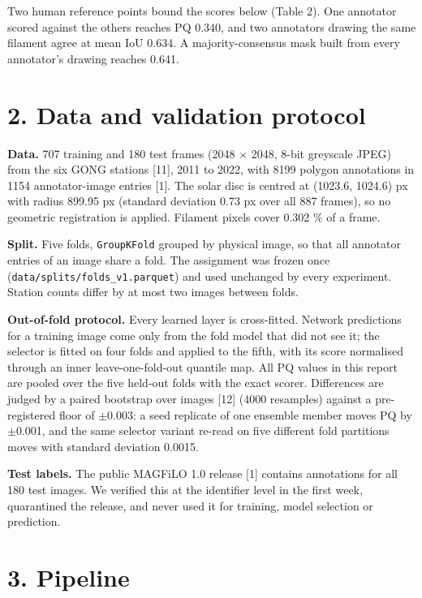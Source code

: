 Two human reference points bound the scores below (Table 2). One annotator scored against the
others reaches PQ 0.340, and two annotators drawing the same filament agree at mean IoU 0.634. A
majority-consensus mask built from every annotator's drawing reaches 0.641.

\section{2. Data and validation protocol}\label{data-and-validation-protocol}

\textbf{Data.} 707 training and 180 test frames (2048 $\times$ 2048, 8-bit greyscale JPEG) from the six GONG
stations {[}11{]}, 2011 to 2022, with 8199 polygon annotations in 1154 annotator-image entries {[}1{]}.
The solar disc is centred at (1023.6, 1024.6) px with radius 899.95 px (standard deviation 0.73 px
over all 887 frames), so no geometric registration is applied. Filament pixels cover 0.302 \% of a
frame.

\textbf{Split.} Five folds, \texttt{GroupKFold} grouped by physical image, so that all annotator entries of an
image share a fold. The assignment was frozen once (\texttt{data/splits/folds\_v1.parquet}) and used
unchanged by every experiment. Station counts differ by at most two images between folds.

\textbf{Out-of-fold protocol.} Every learned layer is cross-fitted. Network predictions for a training
image come only from the fold model that did not see it; the selector is fitted on four folds and
applied to the fifth, with its score normalised through an inner leave-one-fold-out quantile map.
All PQ values in this report are pooled over the five held-out folds with the exact scorer.
Differences are judged by a paired bootstrap over images {[}12{]} (4000 resamples) against a pre-registered
floor of $\pm$0.003: a seed replicate of one ensemble member moves PQ by $\pm$0.001, and the same selector
variant re-read on five different fold partitions moves with standard deviation 0.0015.

\textbf{Test labels.} The public MAGFiLO 1.0 release {[}1{]} contains annotations for all 180 test images.
We verified this at the identifier level in the first week, quarantined the release, and never
used it for training, model selection or prediction.

\section{3. Pipeline}\label{pipeline}

